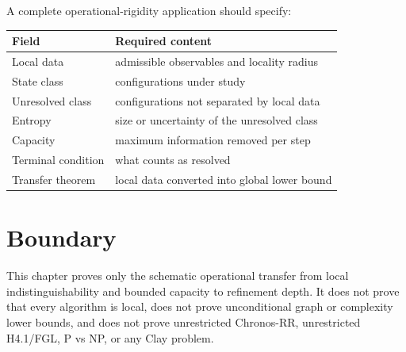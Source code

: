 A complete operational-rigidity application should specify:

\begin{center}
\begin{tabular}{ll}
\toprule
Field & Required content \\
\midrule
Local data & admissible observables and locality radius \\
State class & configurations under study \\
Unresolved class & configurations not separated by local data \\
Entropy & size or uncertainty of the unresolved class \\
Capacity & maximum information removed per step \\
Terminal condition & what counts as resolved \\
Transfer theorem & local data converted into global lower bound \\
\bottomrule
\end{tabular}
\end{center}

\section{Boundary}

This chapter proves only the schematic operational transfer from local
indistinguishability and bounded capacity to refinement depth. It does not
prove that every algorithm is local, does not prove unconditional graph or
complexity lower bounds, and does not prove unrestricted Chronos-RR,
unrestricted H4.1/FGL, P vs NP, or any Clay problem.
